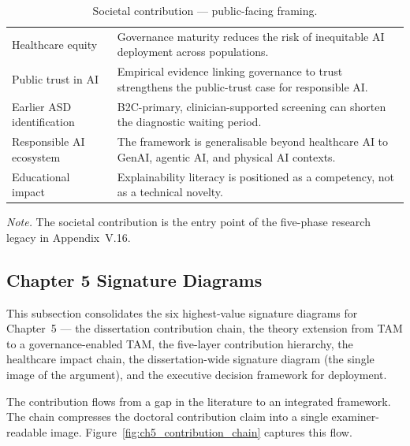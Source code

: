 {\tablestripes\tablefontsize
{}
\begin{xltabular}{\textwidth}{@{} >{\raggedright\arraybackslash}p{5cm} L @{}}
\caption[Societal contribution --- public-facing framing]{Societal contribution --- public-facing framing.}\label{tab:ch5_societal_contribution} \\
\toprule
{} &  \\
\midrule
\endfirsthead
\endhead
\bottomrule
\endlastfoot
Healthcare equity & Governance maturity reduces the risk of inequitable AI deployment across populations. \\
\addlinespace
Public trust in AI & Empirical evidence linking governance to trust strengthens the public-trust case for responsible AI. \\
\addlinespace
Earlier ASD identification & B2C-primary, clinician-supported screening can shorten the diagnostic waiting period. \\
\addlinespace
Responsible AI ecosystem & The framework is generalisable beyond healthcare AI to GenAI, agentic AI, and physical AI contexts. \\
\addlinespace
Educational impact & Explainability literacy is positioned as a competency, not as a technical novelty. \\
\end{xltabular}}

\vspace{0.3em}\noindent\textit{Note.} The societal contribution is the entry point of the five-phase research legacy in Appendix~V.16.



\subsection{Chapter 5 Signature Diagrams}
\label{sec:ch5_signature_diagrams}

\noindent This subsection consolidates the six highest-value signature diagrams for Chapter~5 --- the dissertation contribution chain, the theory extension from TAM to a governance-enabled TAM, the five-layer contribution hierarchy, the healthcare impact chain, the dissertation-wide signature diagram (the single image of the argument), and the executive decision framework for deployment.


\noindent The contribution flows from a gap in the literature to an integrated framework. The chain compresses the doctoral contribution claim into a single examiner-readable image. Figure~\ref{fig:ch5_contribution_chain} captures this flow.

